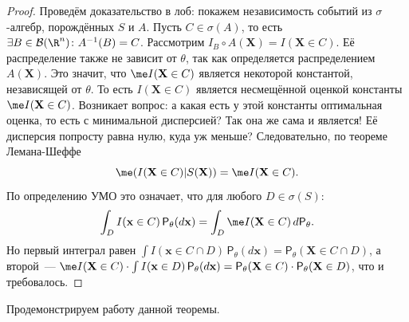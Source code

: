 \begin{proof}
    Проведём доказательство в лоб: покажем независимость событий из $\sigma$-алгебр, порождённых $S$ и $A$. Пусть $C \in \sigma(A)$, то есть $\exists {B \in \mathcal B(\R^n)}\colon A^{-1}(B) = C$. Рассмотрим $I_B \circ A(\mathbf X) = I(\mathbf X \in C)$. Её распределение также не зависит от $\theta$, так как определяется распределением $A(\mathbf X)$. Это значит, что $\me I(\mathbf X \in C)$ является некоторой константой, независящей от $\theta$. То есть $I(\mathbf X \in C)$ является несмещённой оценкой константы $\me I(\mathbf X \in C)$. Возникает вопрос: а какая есть у этой константы оптимальная оценка, то есть с минимальной дисперсией? Так она же сама и является! Её дисперсия попросту равна нулю, куда уж меньше? Следовательно, по теореме Лемана-Шеффе
    \[
    \me (I(\mathbf X \in C) | S(\mathbf X)) = \me I(\mathbf X \in C).
    \]
    По определению УМО это означает, что для любого $D \in \sigma(S)$:
    \[
    \int_D I(\mathbf x \in C)\,\mathsf{P}_{\theta}(d\mathbf x) = \int_D \me I(\mathbf X \in C)\,d\mathsf{P}_{\theta}.
    \]
    Но первый интеграл равен $\int I(\mathbf x \in C \cap D)\,\mathsf{P}_{\theta}(d\mathbf x) = \mathsf{P}_{\theta}(\mathbf X \in C \cap D)$, а второй~--- $\me I(\mathbf X \in C) \cdot \int I(\mathbf x \in D)\,\mathsf{P}_{\theta}(d\mathbf x) = \mathsf{P}_{\theta}(\mathbf X \in C)\cdot\mathsf{P}_{\theta}(\mathbf X \in D)$, что и требовалось.
\end{proof}

Продемонстрируем работу данной теоремы.

